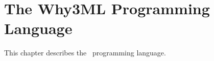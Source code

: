 \chapter{The Why3ML Programming Language}
\label{chap:whyml}

This chapter describes the \whyml\ programming language.



